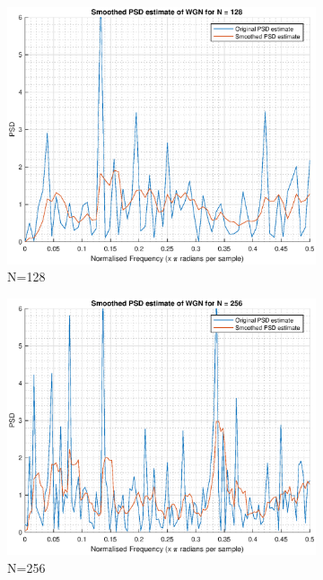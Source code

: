 \documentclass{article}
\begin{document}
\begin{figure}[h!]
\centering
\begin{subfigure}{0.32\textwidth}
\centering
\includegraphics[width = \textwidth]{pgm_128_smooth}
\caption{N=128}
\label{fig:pgm_128_smooth}
\end{subfigure}
\begin{subfigure}{0.32\textwidth}
\centering
\includegraphics[width = \textwidth]{pgm_256_smooth}
\caption{N=256}
\label{fig:pgm_256_smooth}
\end{subfigure}
\begin{subfigure}{0.32\textwidth}

\end{subfigure}
\end{figure}
\end{document}
